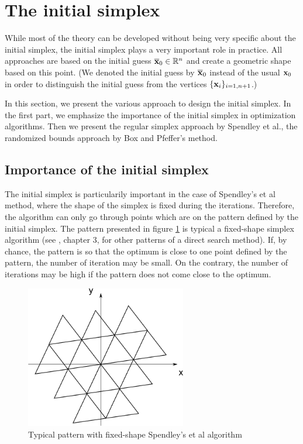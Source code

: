 \section{The initial simplex}

While most of the theory can be developed without being very specific 
about the initial simplex, the initial simplex plays a very important role in practice.
All approaches are based on the initial guess $\overline{\mathbf{x}}_0\in\mathbb{R}^n$ and create a 
geometric shape based on this point.
(We denoted the initial guess by $\overline{\mathbf{x}}_0$ instead of the usual $\mathbf{x}_0$
in order to distinguish the initial guess from the vertices $\{\mathbf{x}_i\}_{i=1,n+1}$.)


In this section, we present the various approach to design the initial 
simplex. In the first part, we emphasize the importance of the initial
simplex in optimization algorithms. Then we present the regular simplex 
approach by Spendley et al., the randomized bounds approach by Box and 
Pfeffer's method.

\subsection{Importance of the initial simplex}

The initial simplex is particularily important in the case of Spendley's et al 
method, where the shape of the simplex is fixed during the iterations.
Therefore, the algorithm can only go through points which are on the pattern
defined by the initial simplex. The pattern presented in figure \ref{fig-nm-simplex-fixedshape}
is typical a fixed-shape simplex algorithm (see \cite{Torczon89multi-directionalsearch}, chapter 3, 
for other patterns of a direct search method).
If, by chance, the pattern is so that the optimum is close to one point 
defined by the pattern, the number of iteration may be small. On the contrary, the 
number of iterations may be high if the pattern does not come close to the 
optimum.

\begin{figure}
\begin{center}
\includegraphics[width=7cm]{simplex_initialfixed.png}
\end{center}
\caption{Typical pattern with fixed-shape Spendley's et al algorithm}
\label{fig-nm-simplex-fixedshape}
\end{figure}

